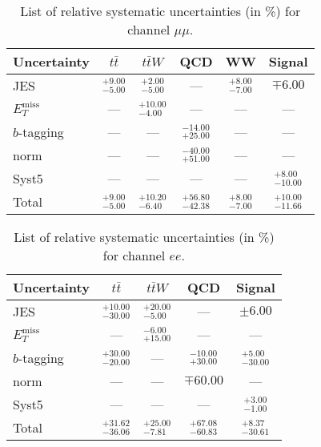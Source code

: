 \begin{table}\begin{center}
\caption{List of relative systematic uncertainties (in \%) for channel $\mu\mu$.}
\renewcommand{\arraystretch}{1.3}
\begin{tabular}{l *{5}{c}}
\hline\hline
Uncertainty & $t\bar{t}$ & $t\bar{t}W$ & QCD & WW & Signal \\
\hline\hline
JES & $_{-5.00}^{+9.00}$ & $_{-5.00}^{+2.00}$ & --- & $_{-7.00}^{+8.00}$ & $\mp 6.00$ \\
\hline
$E_{T}^\text{miss}$ & --- & $_{-4.00}^{+10.00}$ & --- & --- & --- \\
\hline
$b$-tagging & --- & --- & $_{+25.00}^{-14.00}$ & --- & --- \\
\hline
norm & --- & --- & $_{+51.00}^{-40.00}$ & --- & --- \\
\hline
Syst5 & --- & --- & --- & --- & $_{-10.00}^{+8.00}$ \\
\hline
\hline
Total & $_{-5.00}^{+9.00}$ & $_{-6.40}^{+10.20}$ & $_{-42.38}^{+56.80}$ & $_{-7.00}^{+8.00}$ & $_{-11.66}^{+10.00}$ \\
\hline
\end{tabular}
\end{center}\end{table} 

\begin{table}\begin{center}
\caption{List of relative systematic uncertainties (in \%) for channel $ee$.}
\renewcommand{\arraystretch}{1.3}
\begin{tabular}{l *{4}{c}}
\hline\hline
Uncertainty & $t\bar{t}$ & $t\bar{t}W$ & QCD & Signal \\
\hline\hline
JES & $_{-30.00}^{+10.00}$ & $_{-5.00}^{+20.00}$ & --- & $\pm 6.00$ \\
\hline
$E_{T}^\text{miss}$ & --- & $_{+15.00}^{-6.00}$ & --- & --- \\
\hline
$b$-tagging & $_{-20.00}^{+30.00}$ & --- & $_{+30.00}^{-10.00}$ & $_{-30.00}^{+5.00}$ \\
\hline
norm & --- & --- & $\mp 60.00$ & --- \\
\hline
Syst5 & --- & --- & --- & $_{-1.00}^{+3.00}$ \\
\hline
\hline
Total & $_{-36.06}^{+31.62}$ & $_{-7.81}^{+25.00}$ & $_{-60.83}^{+67.08}$ & $_{-30.61}^{+8.37}$ \\
\hline
\end{tabular}
\end{center}\end{table} 

